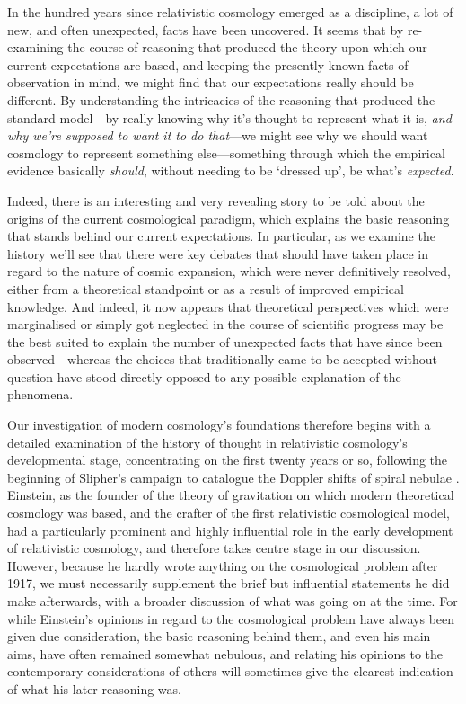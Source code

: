 \documentclass[12 pt]{article}
\begin{document}
In the hundred years since relativistic cosmology emerged as a discipline, a lot of new, and often unexpected, facts have been uncovered. It seems that by re-examining the course of reasoning that produced the theory upon which our current expectations are based, and keeping the presently known facts of observation in mind, we might find that our expectations really should be different. By understanding the intricacies of the reasoning that produced the standard model---by really knowing why it's thought to represent what it is, \textit{and why we're supposed to want it to do that}---we might see why we should want cosmology to represent something else---something through which the empirical evidence basically \textit{should}, without needing to be `dressed up', be what's \textit{expected}. 

Indeed, there is an interesting and very revealing story to be told about the origins of the current cosmological paradigm, which explains the basic reasoning that stands behind our current expectations. In particular, as we examine the history we'll see that there were key debates that should have taken place in regard to the nature of cosmic expansion, which were never definitively resolved, either from a theoretical standpoint or as a result of improved empirical knowledge. And indeed, it now appears that theoretical perspectives which were marginalised or simply got neglected in the course of scientific progress may be the best suited to explain the number of unexpected facts that have since been observed---whereas the choices that traditionally came to be accepted without question have stood directly opposed to any possible explanation of the phenomena.

Our investigation of modern cosmology's foundations therefore begins with a detailed examination of the history of thought in relativistic cosmology's developmental stage, concentrating on the first twenty years or so, following the beginning of Slipher's campaign to catalogue the Doppler shifts of spiral nebulae \citep{Slipher1913}. Einstein, as the founder of the theory of gravitation on which modern theoretical cosmology was based, and the crafter of the first relativistic cosmological model, had a particularly prominent and highly influential role in the early development of relativistic cosmology, and therefore takes centre stage in our discussion. However, because he hardly wrote anything on the cosmological problem after 1917, we must necessarily supplement the brief but influential statements he did make afterwards, with a broader discussion of what was going on at the time. For while Einstein's opinions in regard to the cosmological problem have always been given due consideration, the basic reasoning behind them, and even his main aims, have often remained somewhat nebulous, and relating his opinions to the contemporary considerations of others will sometimes give the clearest indication of what his later reasoning was.
\end{document}
